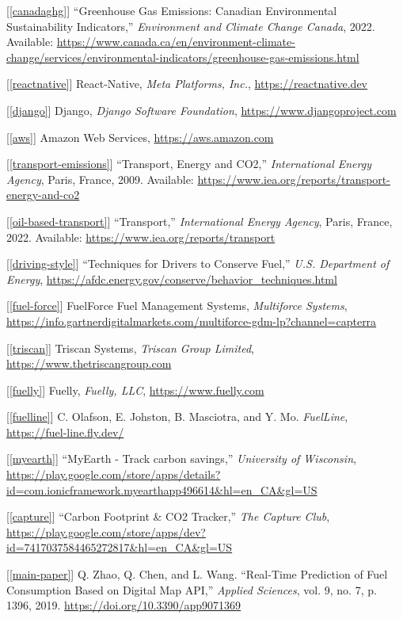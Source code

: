 \documentclass[11pt, oneside]{article}
\newcommand{\refinit}[1]{\noindent \hangindent=0.6cm [\ref*{#1}]}  %
\begin{document}
\begin{footnotesize}

\refinit{canadaghg} ``Greenhouse Gas Emissions: Canadian Environmental Sustainability Indicators,'' \textit{Environment and Climate Change Canada}, 2022. Available: \url{https://www.canada.ca/en/environment-climate-change/services/environmental-indicators/greenhouse-gas-emissions.html}

\refinit{reactnative} React-Native, \textit{Meta Platforms, Inc.}, \url{https://reactnative.dev}

\refinit{django} Django, \textit{Django Software Foundation}, \url{https://www.djangoproject.com}

\refinit{aws} Amazon Web Services, \url{https://aws.amazon.com}

\refinit{transport-emissions} ``Transport, Energy and CO2,'' \textit{International Energy Agency}, Paris, France, 2009. Available: \url{https://www.iea.org/reports/transport-energy-and-co2}

\refinit{oil-based-transport} ``Transport,'' \textit{International Energy Agency}, Paris, France, 2022. Available: \url{https://www.iea.org/reports/transport}

\refinit{driving-style} ``Techniques for Drivers to Conserve Fuel,'' \textit{U.S. Department of Energy}, \url{https://afdc.energy.gov/conserve/behavior_techniques.html}

\refinit{fuel-force} FuelForce Fuel Management Systems, \textit{Multiforce Systems}, \url{https://info.gartnerdigitalmarkets.com/multiforce-gdm-lp?channel=capterra}

\refinit{triscan} Triscan Systems, \textit{Triscan Group Limited}, \url{https://www.thetriscangroup.com}

\refinit{fuelly} Fuelly, \textit{Fuelly, LLC}, \url{https://www.fuelly.com}

\refinit{fuelline} C. Olafson, E. Johston, B. Masciotra, and Y. Mo. \textit{FuelLine}, \url{https://fuel-line.fly.dev/}

\refinit{myearth} ``MyEarth - Track carbon savings,'' \textit{University of Wisconsin}, \url{https://play.google.com/store/apps/details?id=com.ionicframework.myearthapp496614&hl=en_CA&gl=US}

\refinit{capture} ``Carbon Footprint \& CO2 Tracker,'' \textit{The Capture Club}, \url{https://play.google.com/store/apps/dev?id=7417037584465272817&hl=en_CA&gl=US}

\refinit{main-paper}  Q. Zhao, Q. Chen, and L. Wang. ``Real-Time Prediction of Fuel Consumption Based on Digital Map API,'' \textit{Applied Sciences}, vol. 9, no. 7, p. 1396, 2019. \url{https://doi.org/10.3390/app9071369}


\end{footnotesize}
\end{document}

